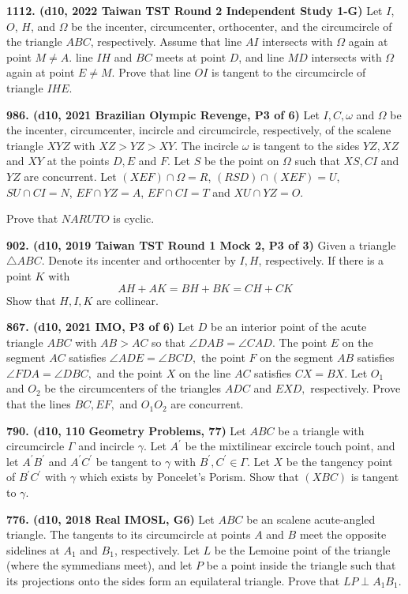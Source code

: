 \documentclass{article}
\begin{document}
\textbf{1112. (\color{red}d10\color{black}, 2022 Taiwan TST Round 2 Independent Study 1-G)} Let $I$, $O$, $H$, and $\Omega$ be the incenter, circumcenter, orthocenter, and the circumcircle of the triangle $ABC$, respectively. Assume that line $AI$ intersects with $\Omega$ again at point $M\neq A$. line $IH$ and $BC$ meets at point $D$, and line $MD$ intersects with $\Omega$ again at point $E\neq M$. Prove that line $OI$ is tangent to the circumcircle of triangle $IHE$.

\textbf{986. (\color{red}d10\color{black}, 2021 Brazilian Olympic Revenge, P3 of 6)} Let $I, C, \omega$ and $\Omega$ be the incenter, circumcenter, incircle and circumcircle, respectively, of the scalene triangle  $XYZ$ with $XZ > YZ > XY$. The incircle $\omega$ is tangent to the sides $YZ, XZ$ and $XY$ at the points $D, E$ and $F$. Let $S$ be the point on $\Omega$ such that $XS, CI$ and $YZ$ are concurrent. Let $(XEF) \cap \Omega = R$, $(RSD) \cap (XEF) = U$, $SU \cap CI = N$, $EF \cap YZ = A$, $EF \cap CI = T$ and $XU \cap YZ = O$.

Prove that $NARUTO$ is cyclic.

\textbf{902. (\color{red}d10\color{black}, 2019 Taiwan TST Round 1 Mock 2, P3 of 3)} Given a triangle $ \triangle ABC $. Denote its incenter and orthocenter by $ I, H $, respectively. If there is a point $ K $ with$$ AH+AK = BH+BK = CH+CK $$Show that $ H, I, K $ are collinear.


\textbf{867. (\color{red}d10\color{black}, 2021 IMO, P3 of 6)} Let $D$ be an interior point of the acute triangle $ABC$ with $AB > AC$ so that $\angle DAB = \angle CAD.$ The point $E$ on the segment $AC$ satisfies $\angle ADE =\angle BCD,$ the point $F$ on the segment $AB$ satisfies $\angle FDA =\angle DBC,$ and the point $X$ on the line $AC$ satisfies $CX = BX.$ Let $O_1$ and $O_2$ be the circumcenters of the triangles $ADC$ and $EXD,$ respectively. Prove that the lines $BC, EF,$ and $O_1O_2$ are concurrent.

\textbf{790. (\color{red}d10\color{black}, 110 Geometry Problems, 77)} Let $A B C$ be a triangle with circumcircle $\Gamma$ and incircle $\gamma$. Let $A^{\prime}$ be the mixtilinear excircle touch point, and let $A^{\prime} B^{\prime}$ and $A^{\prime} C^{\prime}$ be tangent to $\gamma$ with $B^{\prime}, C^{\prime} \in \Gamma$. Let $X$ be the tangency point of $B^{\prime} C^{\prime}$ with $\gamma$ which exists by Poncelet's Porism. Show that $(X B C)$ is tangent to $\gamma$.

\textbf{776. (\color{red}d10\color{black}, 2018 Real IMOSL, G6)} Let $A B C$ be an scalene acute-angled triangle. The tangents to its circumcircle at points $A$ and $B$ meet the opposite sidelines at $A_{1}$ and $B_{1}$, respectively. Let $L$ be the Lemoine point of the triangle (where the symmedians meet), and let $P$ be a point inside the triangle such that its projections onto the sides form an equilateral triangle. Prove that $L P \perp A_{1} B_{1}$.
\end{document}

